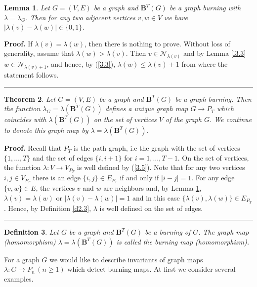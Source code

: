 \documentclass[a4paper, 11pt]{article}
\newtheorem{theorem}{Theorem}[section]
\newtheorem{lemma}[theorem]{Lemma}
\newtheorem{definition}[theorem]{Definition}
\newenvironment{proof}[1][Proof]{\textbf{#1.} }{\ \rule{0.5em}{0.5em}}
\newcommand{\PG}{P}
\begin{document}
\begin{lemma}\label{l3.4}
Let $G=(V,E)$ be a graph and $\mathbf  B^T(G)$ be a graph burning with $\lambda=\lambda_G$.  Then for any two adjacent vertices $v,w\in V$  we have $|\lambda(v)-\lambda(w)|\in\{0,1\}$.
\end{lemma}

\begin{proof}
If $\lambda(v)=\lambda(w)$, then there is nothing to prove. Without loss of generality,  assume that $\lambda(w)>\lambda(v)$. Then $v\in\mathcal N_{\lambda(v)}$ and by Lemma \ref{l3.3} $w\in \mathcal N_{\lambda(v)+1}$, and hence, by (\ref{3.3}),  $\lambda(w) \le \lambda(v)+1$ from where the statement follows.
\end{proof}

\begin{theorem}\label{t3.5} Let $G=(V,E)$ be a graph and $\mathbf  B^T(G)$ be a graph burning. Then the function $\lambda_G=\lambda(\mathbf  B^T(G))$  defines a unique graph   map $G\to \PG_T$  which coincides 
with  $\lambda(\mathbf  B^T(G))$ on the set of vertices $V$ of the graph $G$. We continue to denote this graph map  by $\lambda=\lambda(\mathbf  B^T(G))$. 
\end{theorem}

\begin{proof} Recall that $P_T$ is the path graph, i.e the graph with the set of vertices $\{1,\dots , T\}$ and the set of edges $\{i, i+1\}$ for $i=1, \dots, T-1$. On the set of vertices,  the function $\lambda \colon V\to V_{P_T}$  is well defined by (\ref{3.5}).  Note that for any two vertices $i, j\in V_{P_T}$ there is an edge $\{i,j\}\in E_{P_T}$  if and only if $|i-j|=1$. For any edge $\{v,w\}\in E$, the vertices $v$ and $w$ are neighbors
and,   by Lemma \ref{l3.4},  $\lambda(v)=\lambda(w)$ or $|\lambda(v)- \lambda(w)|=1$ and in this case 
$\{\lambda(v), \lambda(w)\}\in E_{P_T}$. Hence, by Definition \ref{d2.3},  $\lambda$ is well defined on the set of edges. 
\end{proof}



\begin{definition}\label{d3.6}\rm Let $G$ be a graph and    $\mathbf  B^T(G)$   be a burning of $G$. The graph map (homomorphism) $\lambda=\lambda(\mathbf  B^T(G))$ is called the \emph{burning map (homomorphism)}.   
\end{definition}



For a graph $G$ we would like to  describe invariants of graph maps $\lambda\colon G\to \PG_n  \, (n\geq 1)$ which detect burning maps. At first we consider several examples. 
\end{document}
